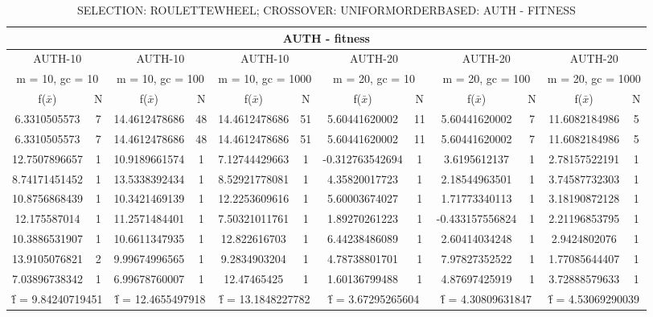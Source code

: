 \begin{table}[H]
	\centering
	\caption{SELECTION: ROULETTEWHEEL; CROSSOVER: UNIFORMORDERBASED: AUTH - FITNESS}
	\begin{adjustbox}{width=1\textwidth}
		\begin{tabular}{ |c|c||c|c||c|c||c|c||c|c||c|c| }
			\hline
			\multicolumn{12}{|c|}{AUTH - fitness} \\
			\hline
			\multicolumn{2}{|c||}{AUTH-10} & \multicolumn{2}{c||}{AUTH-10} & \multicolumn{2}{c||}{AUTH-10} & \multicolumn{2}{c||}{AUTH-20} & \multicolumn{2}{c||}{AUTH-20} & \multicolumn{2}{c|}{AUTH-20}\\
			\hline
			\multicolumn{2}{|c||}{m = 10, gc = 10} & \multicolumn{2}{c||}{m = 10, gc = 100} & \multicolumn{2}{c||}{m = 10, gc = 1000} & \multicolumn{2}{c||}{m = 20, gc = 10} & \multicolumn{2}{c||}{m = 20, gc = 100} & \multicolumn{2}{c|}{m = 20, gc = 1000}\\
			\hline
			f($\bar{x}$) & N & f($\bar{x}$) & N & f($\bar{x}$) & N & f($\bar{x}$) & N & f($\bar{x}$) & N & f($\bar{x}$) & N\\
			\hline
			\hline
			6.3310505573 & 7 & 14.4612478686 & 48 & 14.4612478686 & 51 & 5.60441620002 & 11 & 5.60441620002 & 7 & 11.6082184986 & 5\\
			\hline
			6.3310505573 & 7 & 14.4612478686 & 48 & 14.4612478686 & 51 & 5.60441620002 & 11 & 5.60441620002 & 7 & 11.6082184986 & 5\\
			12.7507896657 & 1 & 10.9189661574 & 1 & 7.12744429663 & 1 & -0.312763542694 & 1 & 3.6195612137 & 1 & 2.78157522191 & 1\\
			8.74171451452 & 1 & 13.5338392434 & 1 & 8.52921778081 & 1 & 4.35820017723 & 1 & 2.18544963501 & 1 & 3.74587732303 & 1\\
			10.8756868439 & 1 & 10.3421469139 & 1 & 12.2253609616 & 1 & 5.60003674027 & 1 & 1.71773340113 & 1 & 3.18190872128 & 1\\
			12.175587014 & 1 & 11.2571484401 & 1 & 7.50321011761 & 1 & 1.89270261223 & 1 & -0.433157556824 & 1 & 2.21196853795 & 1\\
			10.3886531907 & 1 & 10.6611347935 & 1 & 12.822616703 & 1 & 6.44238486089 & 1 & 2.60414034248 & 1 & 2.9424802076 & 1\\
			13.9105076821 & 2 & 9.99674996565 & 1 & 9.2834903204 & 1 & 4.78738801701 & 1 & 7.97827352522 & 1 & 1.77085644407 & 1\\
			7.03896738342 & 1 & 6.99678760007 & 1 & 12.47465425 & 1 & 1.60136799488 & 1 & 4.87697425919 & 1 & 3.72888579633 & 1\\
			\hline
			\multicolumn{2}{|c||}{\^{f} = 9.84240719451} & \multicolumn{2}{c||}{\^{f} = 12.4655497918} & \multicolumn{2}{c||}{\^{f} = 13.1848227782} & \multicolumn{2}{c||}{\^{f} = 3.67295265604} & \multicolumn{2}{c||}{\^{f} = 4.30809631847} & \multicolumn{2}{c|}{\^{f} = 4.53069290039}\\
			\hline
		\end{tabular}
	\end{adjustbox}
\end{table}



